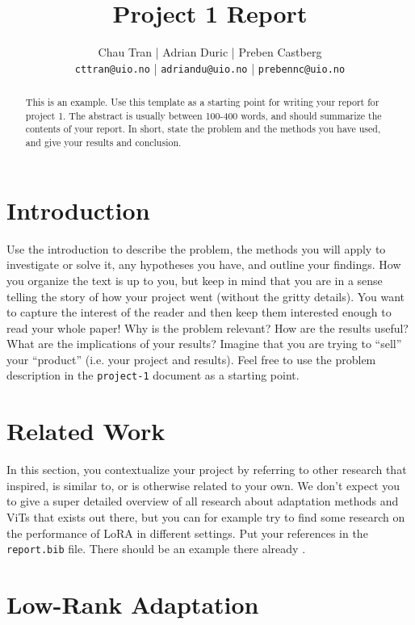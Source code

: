 \documentclass[10pt]{article}
\begin{document}
\title{Project 1 Report}
\author{Chau Tran | Adrian Duric | Preben Castberg\\\footnotesize\texttt{cttran@uio.no} | \texttt{adriandu@uio.no} | \texttt{prebennc@uio.no}}
\date{}
\maketitle

\begin{abstract}
  This is an example. Use this template as a starting point for writing your report for project 1. The abstract is usually between 100-400 words, and should summarize the contents of your report. In short, state the problem and the methods you have used, and give your results and conclusion.
\end{abstract}

\section{Introduction}
Use the introduction to describe the problem, the methods you will apply to investigate or solve it, any hypotheses you have, and outline your findings.
How you organize the text is up to you, but keep in mind that you are in a sense telling the story of how your project went (without the gritty details). You want to capture the interest of the reader and then keep them interested enough to read your whole paper!
Why is the problem relevant? How are the results useful? What are the implications of your results?
Imagine that you are trying to ``sell'' your ``product'' (i.e. your project and results).
Feel free to use the problem description in the \texttt{project-1} document as a starting point.

\section{Related Work}
In this section, you contextualize your project by referring to other research that inspired, is similar to, or is otherwise related to your own.
We don't expect you to give a super detailed overview of all research about adaptation methods and ViTs that exists out there, but you can for example try to find some research on the performance of LoRA in different settings.
Put your references in the \texttt{report.bib} file. There should be an example there already \cite{Test}.

\section{Low-Rank Adaptation}
\label{sec:lora}
\end{document}
